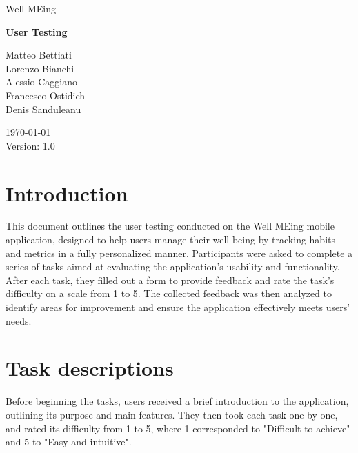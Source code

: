 \documentclass{article}
\begin{document}


\begin{center}

	\fontsize{20pt}{30pt}\selectfont
	Well MEing

	\vspace{2cm}

	\fontsize{25pt}{45pt}\selectfont
	\textbf{User Testing}

	\vfill

	\fontsize{12pt}{18pt}\selectfont
	Matteo Bettiati \\
	Lorenzo Bianchi \\
	Alessio Caggiano \\
	Francesco Ostidich \\
	Denis Sanduleanu \\

	\vspace{1cm}

	\today \\
	\vspace{12pt}
	Version: 1.0
	\normalsize

\end{center}

\newpage
{}
\tableofcontents
\newpage



\section{Introduction}

This document outlines the user testing conducted on the Well MEing mobile application, designed to help users manage their well-being by tracking habits and metrics in a fully personalized manner.
Participants were asked to complete a series of tasks aimed at evaluating the application’s usability and functionality.
After each task, they filled out a form to provide feedback and rate the task’s difficulty on a scale from 1 to 5.
The collected feedback was then analyzed to identify areas for improvement and ensure the application effectively meets users’ needs.

\section{Task descriptions}

Before beginning the tasks, users received a brief introduction to the application, outlining its purpose and main features.
They then took each task one by one, and rated its difficulty from 1 to 5, where 1 corresponded to "Difficult to achieve" and 5 to "Easy and intuitive".
\end{document}
